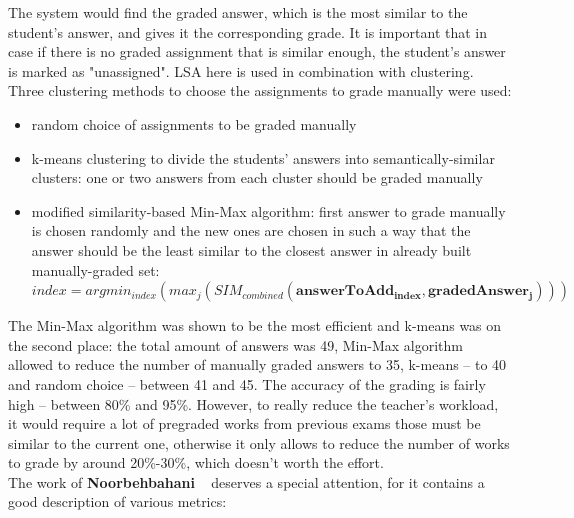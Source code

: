 The system would find the graded answer, which is the most similar to the student's answer, and gives it the corresponding grade. It is important that in case if there is no graded assignment that is similar enough, the student's answer is marked as "unassigned". LSA here is used in combination with clustering. Three clustering methods to choose the assignments to grade manually were used:
\begin{itemize}
\item random choice of assignments to be graded manually
\item k-means clustering to divide the students' answers into semantically-similar clusters: one or two answers from each cluster should be graded manually
\item modified similarity-based Min-Max algorithm: first answer to grade manually is chosen randomly and the new ones are chosen in such a way that the answer should be the least similar to the closest answer in already built manually-graded set:\\ $index = argmin_{index}(max_j (SIM_{combined} (\pmb{answerToAdd_{index}}, \pmb{gradedAnswer_j})))$
\end{itemize}
The Min-Max algorithm was shown to be the most efficient and k-means was on the second place: the total amount of answers was 49, Min-Max algorithm allowed to reduce the number of manually graded answers to 35, k-means -- to 40 and random choice -- between 41 and 45. The accuracy of the grading is fairly high -- between 80\% and 95\%. However, to really reduce the teacher's workload, it would require a lot of pregraded works from previous exams those must be similar to the current one, otherwise it only allows to reduce the number of works to grade by around 20\%-30\%, which doesn't worth the effort. \\

The work of \textbf{Noorbehbahani} ~\cite{Noorbehbahani} deserves a special attention, for it contains a good description of various metrics:

